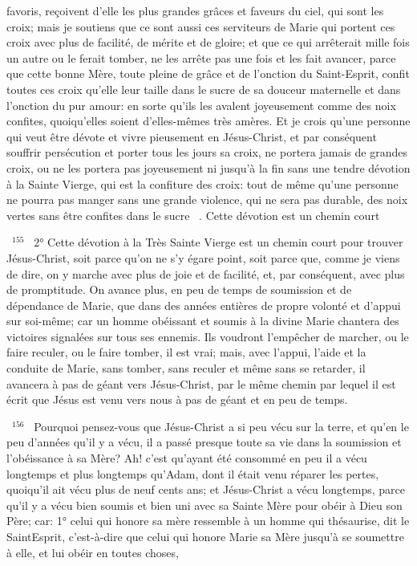 \documentclass[paper=a5,pagesize=pdftex,fontsize=15pt,headinclude=on,twoside=off]{scrbook}
\newcommand{\negphantom}[1]{\settowidth{\dimen0}{#1}\hspace*{-\dimen0}}
\newcommand{\versenb}[1]{\par \vspace{10pt}~\negphantom{~${}^{#1}$~}${}^{#1}$~}
\begin{document}
favoris, reçoivent d'elle les plus grandes grâces et faveurs du ciel, qui sont les croix; mais je soutiens que ce sont
aussi ces serviteurs de Marie qui portent ces croix avec plus de facilité, de mérite et de gloire; et que ce qui
arrêterait mille fois un autre ou le ferait tomber, ne les arrête pas une fois et les fait avancer, parce que cette bonne
Mère, toute pleine de grâce et de l'onction du Saint-Esprit, confit toutes ces croix qu'elle leur taille dans le sucre de
sa douceur maternelle et dans l'onction du pur amour: en sorte qu'ils les avalent joyeusement comme des noix
confites, quoiqu'elles soient d'elles-mêmes très amères. Et je crois qu'une personne qui veut être dévote et vivre
pieusement en Jésus-Christ, et par conséquent souffrir persécution et porter tous les jours sa croix, ne portera
jamais de grandes croix, ou ne les portera pas joyeusement ni jusqu'à la fin sans une tendre dévotion à la Sainte
Vierge, qui est la confiture des croix: tout de même qu'une personne ne pourra pas manger sans une grande
violence, qui ne sera pas durable, des noix vertes sans être confites dans le sucre ~.
Cette dévotion est un chemin court
\versenb{155} 2° Cette dévotion à la Très Sainte Vierge est un chemin court pour trouver Jésus-Christ, soit parce qu'on ne
s'y égare point, soit parce que, comme je viens de dire, on y marche avec plus de joie et de facilité, et, par
conséquent, avec plus de promptitude. On avance plus, en peu de temps de soumission et de dépendance de
Marie, que dans des années entières de propre volonté et d'appui sur soi-même; car un homme obéissant et
soumis à la divine Marie chantera des victoires signalées sur tous ses ennemis. Ils voudront l'empêcher de
marcher, ou le faire reculer, ou le faire tomber, il est vrai; mais, avec l'appui, l'aide et la conduite de Marie, sans
tomber, sans reculer et même sans se retarder, il avancera à pas de géant vers Jésus-Christ, par le même chemin
par lequel il est écrit que Jésus est venu vers nous à pas de géant et en peu de temps.
\versenb{156} Pourquoi pensez-vous que Jésus-Christ a si peu vécu sur la terre, et qu'en le peu d'années qu'il y a vécu, il a
passé presque toute sa vie dans la soumission et l'obéissance à sa Mère? Ah! c'est qu'ayant été consommé en
peu il a vécu longtemps et plus longtemps qu'Adam, dont il était venu réparer les pertes, quoiqu'il ait vécu plus de
neuf cents ans; et Jésus-Christ a vécu longtemps, parce qu'il y a vécu bien soumis et bien uni avec sa Sainte Mère
pour obéir à Dieu son Père; car: 1° celui qui honore sa mère ressemble à un homme qui thésaurise, dit le SaintEsprit, c'est-à-dire que celui qui honore Marie sa Mère jusqu'à se soumettre à elle, et lui obéir en toutes choses,
\end{document}
